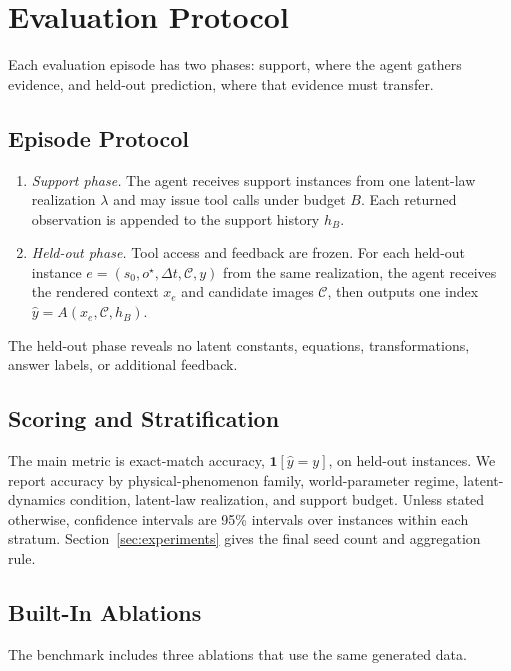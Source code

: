 \section{Evaluation Protocol}
\label{sec:protocol}

Each evaluation episode has two phases: support, where the agent gathers evidence, and held-out prediction, where that evidence must transfer.

\subsection{Episode Protocol}

\begin{enumerate}
  \item \emph{Support phase.} The agent receives support instances from one latent-law realization $\lambda$ and may issue tool calls under budget $B$. Each returned observation is appended to the support history $h_B$.
  \item \emph{Held-out phase.} Tool access and feedback are frozen. For each held-out instance $e=(s_0,o^\star,\Delta t,\mathcal{C},y)$ from the same realization, the agent receives the rendered context $x_e$ and candidate images $\mathcal{C}$, then outputs one index $\hat y=A(x_e,\mathcal{C},h_B)$.
\end{enumerate}

The held-out phase reveals no latent constants, equations, transformations, answer labels, or additional feedback.

\subsection{Scoring and Stratification}

The main metric is exact-match accuracy, $\mathbf{1}[\hat y=y]$, on held-out instances. We report accuracy by physical-phenomenon family, world-parameter regime, latent-dynamics condition, latent-law realization, and support budget. Unless stated otherwise, confidence intervals are 95\% intervals over instances within each stratum. Section~\ref{sec:experiments} gives the final seed count and aggregation rule.

\subsection{Built-In Ablations}
\label{sec:protocol:ablations}

The benchmark includes three ablations that use the same generated data.

